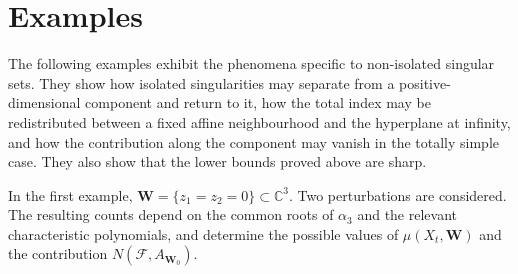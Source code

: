 \documentclass[10pt,twoside]{amsart}
\numberwithin{equation}{section}
\theoremstyle{definition}
\theoremstyle{remark}
\newcommand{\C}{\mathbb{C}}
\newcommand{\fol}{\mathcal{F}}
\newcommand{\W}{\mathbf{W}}
\begin{document}
\section{Examples}\label{sec:examples}

The following examples exhibit the phenomena specific to non-isolated singular sets. They show how isolated singularities may separate from a positive-dimensional component and return to it, how the total index may be redistributed between a fixed affine neighbourhood and the hyperplane at infinity, and how the contribution along the component may vanish in the totally simple case. They also show that the lower bounds proved above are sharp.

In the first example, $\W=\{z_1=z_2=0\}\subset\C^3$. Two perturbations are considered. The resulting counts depend on the common roots of $\alpha_3$ and the relevant characteristic polynomials, and determine the possible values of $\mu(X_t,\W)$ and the contribution $N(\fol,A_{\W_0})$.
\end{document}
